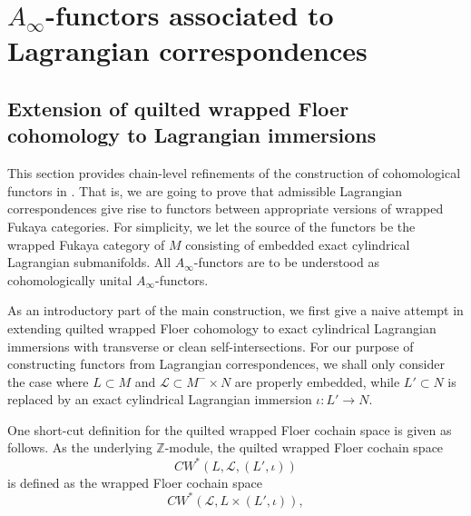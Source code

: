 \documentclass{amsart}
\numberwithin{equation}{section}
\numberwithin{figure}{section}
\begin{document}
\section{$A_{\infty}$-functors associated to Lagrangian correspondences}
\label{A-infinity functors associated to Lagrangian correspondence}

\subsection{Extension of quilted wrapped Floer cohomology to Lagrangian immersions}\label{section: quilted wrapped Floer theory for Lagrangian immersions}
	This section provides chain-level refinements of the construction of cohomological functors in \cite{Gao1}. That is, we are going to prove that admissible Lagrangian correspondences give rise to functors between appropriate versions of wrapped Fukaya categories. For simplicity, we let the source of the functors be the wrapped Fukaya category of $M$ consisting of embedded exact cylindrical Lagrangian submanifolds. All $A_{\infty}$-functors are to be understood as cohomologically unital $A_{\infty}$-functors. \par
	As an introductory part of the main construction, we first give a naive attempt in extending quilted wrapped Floer cohomology to exact cylindrical Lagrangian immersions with transverse or clean self-intersections. For our purpose of constructing functors from Lagrangian correspondences, we shall only consider the case where $L \subset M$ and $\mathcal{L} \subset M^{-} \times N$ are properly embedded, while $L' \subset N$ is replaced by an exact cylindrical Lagrangian immersion $\iota: L' \to N$. \par
	One short-cut definition for the quilted wrapped Floer cochain space is given as follows. As the underlying $\mathbb{Z}$-module, the quilted wrapped Floer cochain space
\begin{equation*}
CW^{*}(L, \mathcal{L}, (L', \iota))
\end{equation*}
is defined as the wrapped Floer cochain space
\begin{equation*}
CW^{*}(\mathcal{L}, L \times (L', \iota)),
\end{equation*}
\end{document}
